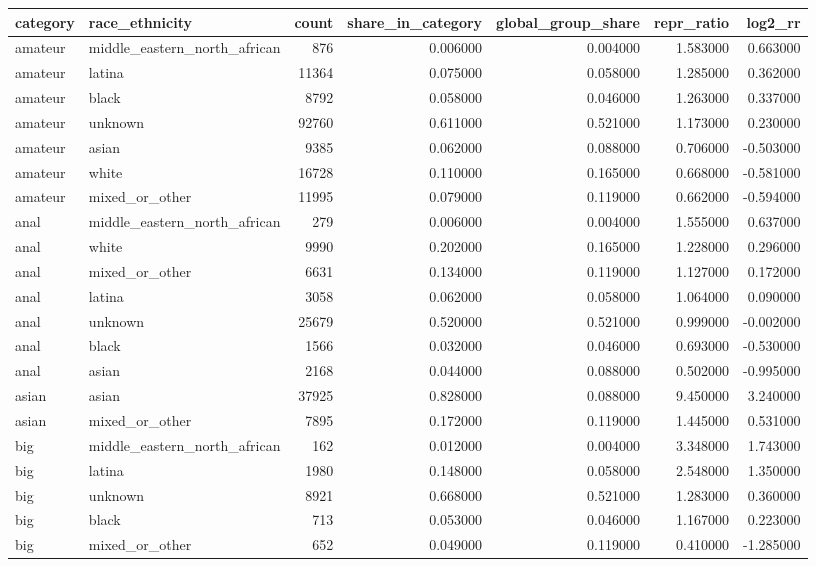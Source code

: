 \begin{tabular}{llrrrrr}
\toprule
category & race_ethnicity & count & share_in_category & global_group_share & repr_ratio & log2_rr \\
\midrule
amateur & middle_eastern_north_african & 876 & 0.006000 & 0.004000 & 1.583000 & 0.663000 \\
amateur & latina & 11364 & 0.075000 & 0.058000 & 1.285000 & 0.362000 \\
amateur & black & 8792 & 0.058000 & 0.046000 & 1.263000 & 0.337000 \\
amateur & unknown & 92760 & 0.611000 & 0.521000 & 1.173000 & 0.230000 \\
amateur & asian & 9385 & 0.062000 & 0.088000 & 0.706000 & -0.503000 \\
amateur & white & 16728 & 0.110000 & 0.165000 & 0.668000 & -0.581000 \\
amateur & mixed_or_other & 11995 & 0.079000 & 0.119000 & 0.662000 & -0.594000 \\
anal & middle_eastern_north_african & 279 & 0.006000 & 0.004000 & 1.555000 & 0.637000 \\
anal & white & 9990 & 0.202000 & 0.165000 & 1.228000 & 0.296000 \\
anal & mixed_or_other & 6631 & 0.134000 & 0.119000 & 1.127000 & 0.172000 \\
anal & latina & 3058 & 0.062000 & 0.058000 & 1.064000 & 0.090000 \\
anal & unknown & 25679 & 0.520000 & 0.521000 & 0.999000 & -0.002000 \\
anal & black & 1566 & 0.032000 & 0.046000 & 0.693000 & -0.530000 \\
anal & asian & 2168 & 0.044000 & 0.088000 & 0.502000 & -0.995000 \\
asian & asian & 37925 & 0.828000 & 0.088000 & 9.450000 & 3.240000 \\
asian & mixed_or_other & 7895 & 0.172000 & 0.119000 & 1.445000 & 0.531000 \\
big & middle_eastern_north_african & 162 & 0.012000 & 0.004000 & 3.348000 & 1.743000 \\
big & latina & 1980 & 0.148000 & 0.058000 & 2.548000 & 1.350000 \\
big & unknown & 8921 & 0.668000 & 0.521000 & 1.283000 & 0.360000 \\
big & black & 713 & 0.053000 & 0.046000 & 1.167000 & 0.223000 \\
big & mixed_or_other & 652 & 0.049000 & 0.119000 & 0.410000 & -1.285000 \\

\end{tabular}
